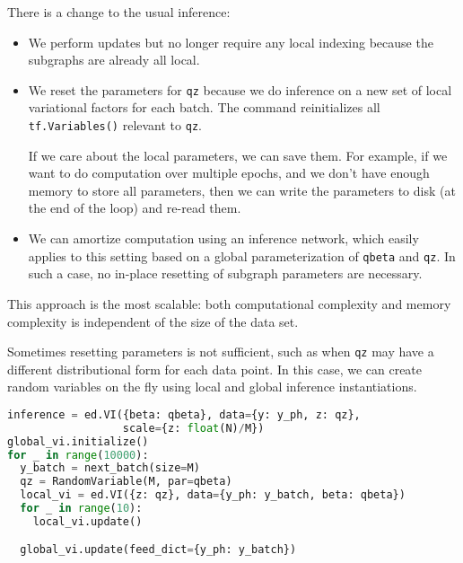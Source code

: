 There is a change to the usual inference:
\begin{itemize}
\item
  We perform updates but no longer require any local indexing because
  the subgraphs are already all local.
\item
  We reset the parameters for \texttt{qz} because we do inference on a new
  set of local variational factors for each batch. The command
  reinitializes all \texttt{tf.Variables()} relevant to \texttt{qz}.

  If we care about the local parameters, we can save them. For
  example, if we want to do computation over multiple epochs, and we
  don't have enough memory to store all parameters, then we can write
  the parameters to disk (at the end of the loop) and re-read them.
\item
  We can amortize computation using an inference network, which easily
  applies to this setting based on a global parameterization of
  \texttt{qbeta} and \texttt{qz}. In such a case, no in-place resetting of subgraph
  parameters are necessary.
\end{itemize}

This approach is the most scalable: both computational complexity and
memory complexity is independent of the size of the data set.

Sometimes resetting parameters is not sufficient, such as when \texttt{qz} may
have a different distributional form for each data point. In this
case, we can create random variables on the fly using
local and global inference instantiations.
\begin{lstlisting}[language=Python]
inference = ed.VI({beta: qbeta}, data={y: y_ph, z: qz},
                  scale={z: float(N)/M})
global_vi.initialize()
for _ in range(10000):
  y_batch = next_batch(size=M)
  qz = RandomVariable(M, par=qbeta)
  local_vi = ed.VI({z: qz}, data={y_ph: y_batch, beta: qbeta})
  for _ in range(10):
    local_vi.update()

  global_vi.update(feed_dict={y_ph: y_batch})
\end{lstlisting}

